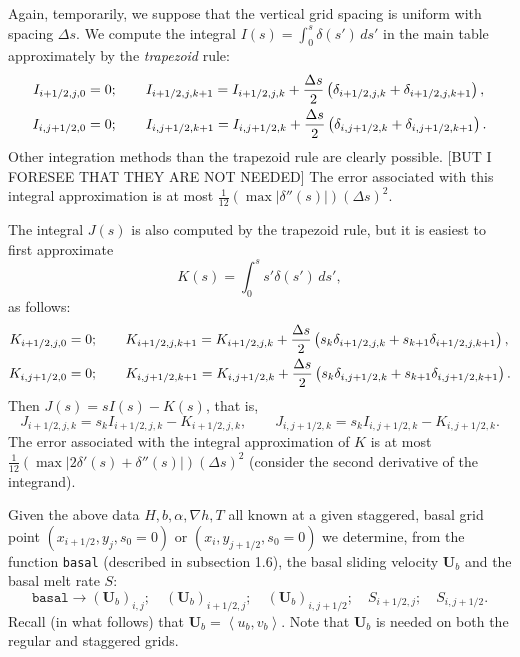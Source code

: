 \documentclass{amsart}%
\theoremstyle{plain}
\theoremstyle{definition}
\theoremstyle{remark}
\newcommand{\mtt}{\texttt}
\newcommand{\grad}{\nabla}
\newcommand{\ip}[2]{\ensuremath{\left<#1,#2\right>}}
\newcommand{\bU}{{\mathbf{U}}}
\begin{document}
Again, temporarily, we suppose that the vertical grid spacing is uniform with spacing $\Delta s$.  We compute the integral $I(s)=\int_0^s \delta(s')\,ds'$ in the main table approximately by the \emph{trapezoid} rule:
\begin{align}
I_{i+1/2,j,0}&=0; \qquad I_{i+1/2,j,k+1}= I_{i+1/2,j,k} + \frac{\Delta s}{2}\left(\delta_{i+1/2,j,k}+\delta_{i+1/2,j,k+1}\right), \notag\\
I_{i,j+1/2,0}&=0; \qquad I_{i,j+1/2,k+1}= I_{i,j+1/2,k} + \frac{\Delta s}{2}\left(\delta_{i,j+1/2,k}+\delta_{i,j+1/2,k+1}\right).\notag
\end{align}
Other integration methods than the trapezoid rule are clearly possible. [BUT I FORESEE THAT THEY ARE NOT NEEDED]   The error associated with this integral approximation is at most $\frac{1}{12} \left(\max |\delta''(s)|\right) (\Delta s)^2$.

The integral $J(s)$ is also computed by the trapezoid rule, but it is easiest to first approximate
    $$K(s)=\int_0^s s' \delta(s')\,ds',$$
as follows:
\begin{align}
K_{i+1/2,j,0}&=0; \qquad K_{i+1/2,j,k+1}= K_{i+1/2,j,k} + \frac{\Delta s}{2}\left(s_k \delta_{i+1/2,j,k}+s_{k+1}\delta_{i+1/2,j,k+1}\right), \notag\\
K_{i,j+1/2,0}&=0; \qquad K_{i,j+1/2,k+1}= K_{i,j+1/2,k} + \frac{\Delta s}{2}\left(s_k \delta_{i,j+1/2,k} + s_{k+1}\delta_{i,j+1/2,k+1}\right).\notag
\end{align}
Then $J(s)=sI(s)-K(s)$, that is,
\begin{equation}
  J_{i+1/2,j,k}=s_k I_{i+1/2,j,k} - K_{i+1/2,j,k}, \qquad J_{i,j+1/2,k}=s_k I_{i,j+1/2,k} - K_{i,j+1/2,k}.
\end{equation}
The error associated with the integral approximation of $K$ is at most $\frac{1}{12} \left(\max |2\delta'(s)+\delta''(s)|\right) (\Delta s)^2$ (consider the second derivative of the integrand).

Given the above data $H,b,\alpha,\grad h,T$ all known at a given staggered, basal grid point $(x_{i+1/2},y_j,s_0=0)$ or $(x_i,y_{j+1/2},s_0=0)$ we determine, from the function \mtt{basal} (described in subsection 1.6), the basal sliding velocity $\bU_b$ and the basal melt rate $S$:
\begin{equation}
  \mtt{basal} \to (\bU_b)_{i,j}; \quad (\bU_b)_{i+1/2,j};\quad (\bU_b)_{i,j+1/2}; \quad S_{i+1/2,j}; \quad S_{i,j+1/2}.
\end{equation}
Recall (in what follows) that $\bU_b=\ip{u_b}{v_b}$.  Note that $\bU_b$ is needed on both the regular and staggered grids.
\end{document}
